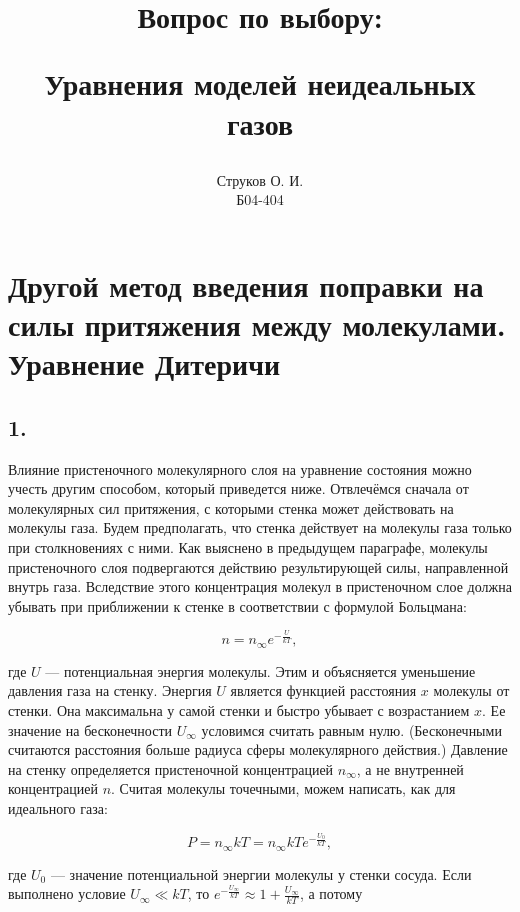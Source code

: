 \documentclass[12pt]{article} %
\title{\begin{center}Вопрос по выбору:\end{center}
Уравнения моделей неидеальных газов}
\author{Струков О. И. \\ Б04-404}
\date{}
\begin{document}
    \maketitle
    \newpage


\section*{Другой метод введения поправки на силы притяжения между молекулами. Уравнение Дитеричи}

\subsection*{1. }

Влияние пристеночного молекулярного слоя на уравнение состояния можно учесть другим способом, который приведется ниже. Отвлечёмся сначала от молекулярных сил притяжения, с которыми стенка может действовать на молекулы газа. Будем предполагать, что стенка действует на молекулы газа только при столкновениях с ними. Как выяснено в предыдущем параграфе, молекулы пристеночного слоя подвергаются действию результирующей силы, направленной внутрь газа. Вследствие этого концентрация молекул в пристеночном слое должна убывать при приближении к стенке в соответствии с формулой Больцмана:

\begin{equation}
n = n_\infty e^{-\frac{U}{kT}}, \tag{99.1}
\end{equation}

где $U$ — потенциальная энергия молекулы. Этим и объясняется уменьшение давления газа на стенку. Энергия $U$ является функцией расстояния $x$ молекулы от стенки. Она максимальна у самой стенки и быстро убывает с возрастанием $x$. Ее значение на бесконечности $U_\infty$ условимся считать равным нулю. (Бесконечными считаются расстояния больше радиуса сферы молекулярного действия.) Давление на стенку определяется пристеночной концентрацией $n_\infty$, а не внутренней концентрацией $n$. Считая молекулы точечными, можем написать, как для идеального газа:

\begin{equation}
P = n_\infty kT = n_\infty kTe^{-\frac{U_0}{kT}}, \tag{99.2}
\end{equation}

где $U_0$ — значение потенциальной энергии молекулы у стенки сосуда. Если выполнено условие $U_\infty \ll kT$, то $e^{-\frac{U_\infty}{kT}} \approx 1 + \frac{U_\infty}{kT}$, а потому
\end{document}
